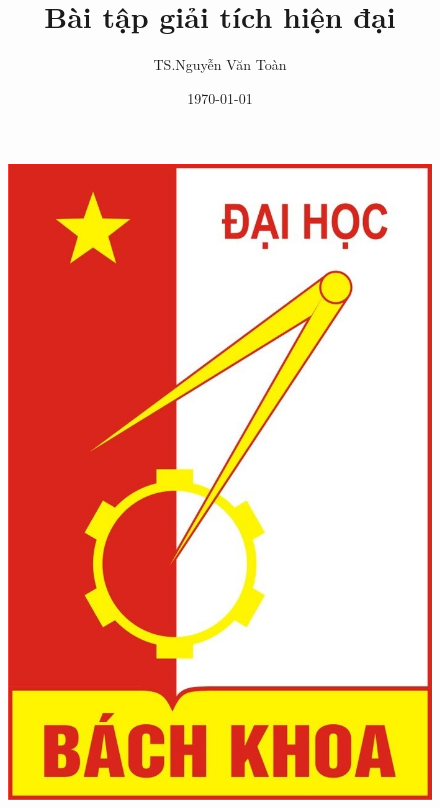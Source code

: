 \documentclass[12pt,a4paper]{article}
\begin{document}


\author{TS.Nguyễn Văn Toàn}    %
\title{Bài tập giải tích hiện đại}    %
\date{\today{}}  %

\maketitle{}   %

\begin{center}       %
    \begin{figure}[htp]
    \begin{center}
     \includegraphics[scale=.2]{logo}
    \end{center}
    \label{}
    \end{figure}
\end{center}
\end{document}
